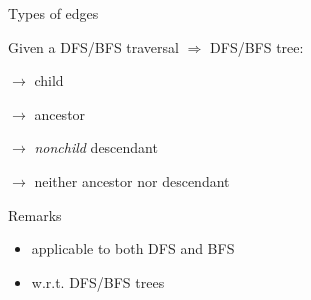 \begin{frame}{Types of edges}
  \begin{definition}
    Given a DFS/BFS traversal $\Rightarrow$ DFS/BFS tree:
	\begin{description}
	  \item[Tree edge:] $\to$ child
	  \item[Back edge:] $\to$ ancestor
	  \item[Forward edge:] $\to$ \emph{nonchild} descendant
	  \item[Cross edge:] $\to$ neither ancestor nor descendant
    \end{description}
  \end{definition}

  \pause
  \begin{alertblock}{Remarks}
    \begin{itemize}
      \item applicable to both DFS and BFS
      \item w.r.t. DFS/BFS trees
    \end{itemize}
  \end{alertblock}
\end{frame}
